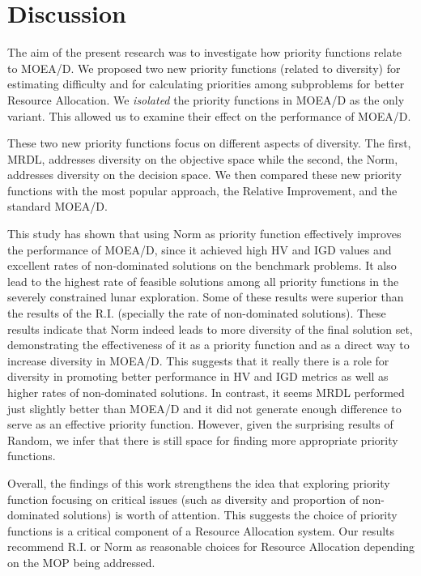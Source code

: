 \section{Discussion}
The aim of the present research was to investigate how priority functions relate to MOEA/D. We proposed two new priority functions (related to diversity) for estimating difficulty and for calculating priorities among subproblems for better Resource Allocation. We \emph{isolated} the priority functions in MOEA/D as the only variant. This allowed us to examine their effect on the performance of MOEA/D.

These two new priority functions focus on different aspects of diversity. The first, MRDL, addresses diversity on the objective space while the second, the Norm, addresses diversity on the decision space. We then compared these new priority functions with the most popular approach, the Relative Improvement, and the standard MOEA/D.

This study has shown that using Norm as priority function effectively improves the performance of MOEA/D, since it achieved high HV and IGD values and excellent rates of non-dominated solutions on the benchmark problems. It also lead to the highest rate of feasible solutions among all priority functions in the severely constrained lunar exploration. Some of these results were superior than the results of the R.I. (specially the rate of non-dominated solutions). These results indicate that Norm indeed leads to more diversity of the final solution set, demonstrating the effectiveness of it as a priority function and as a direct way to increase diversity in MOEA/D. This suggests that it really there is a role for diversity in promoting better performance in HV and IGD metrics as well as higher rates of non-dominated solutions. In contrast, it seems MRDL performed just slightly better than MOEA/D and it did not generate enough difference to serve as an effective priority function. However, given the surprising results of Random, we infer that there is still space for finding more appropriate priority functions.

Overall, the findings of this work strengthens the idea that exploring priority function focusing on critical issues (such as diversity and proportion of non-dominated solutions) is worth of attention. This suggests the choice of priority functions is a critical component of a Resource Allocation system. Our results recommend R.I. or Norm as reasonable choices for Resource Allocation depending on the MOP being addressed.



